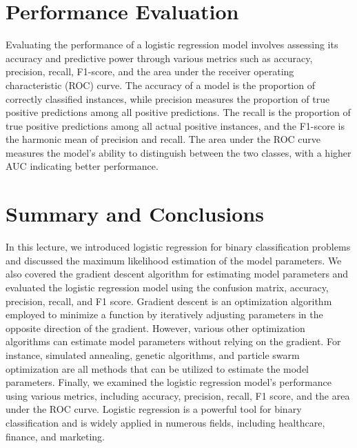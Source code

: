 \documentclass{article}[12pt]
\begin{document}
\section{Performance Evaluation}
Evaluating the performance of a logistic regression model involves assessing its accuracy and predictive power through various metrics such as accuracy, precision, recall, F1-score, and the area under the receiver operating characteristic (ROC) curve.
The accuracy of a model is the proportion of correctly classified instances, while precision measures the proportion of true positive predictions among all positive predictions. The recall is the proportion of true positive predictions among all actual positive instances, and the F1-score is the harmonic mean of precision and recall. The area under the ROC curve measures the model's ability to distinguish between the two classes, with a higher AUC indicating better performance.

\section{Summary and Conclusions}
In this lecture, we introduced logistic regression for binary classification problems and discussed the maximum likelihood estimation of the model parameters. We also covered the gradient descent algorithm for estimating model parameters and evaluated the logistic regression model using the confusion matrix, accuracy, precision, recall, and F1 score. Gradient descent is an optimization algorithm employed to minimize a function by iteratively adjusting parameters in the opposite direction of the gradient. However, various other optimization algorithms can estimate model parameters without relying on the gradient. For instance, simulated annealing, genetic algorithms, and particle swarm optimization are all methods that can be utilized to estimate the model parameters. Finally, we examined the logistic regression model's performance using various metrics, including accuracy, precision, recall, F1 score, and the area under the ROC curve. Logistic regression is a powerful tool for binary classification and is widely applied in numerous fields, including healthcare, finance, and marketing.



\end{document}
